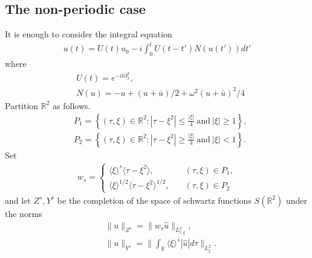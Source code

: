 \documentclass{amsart}
\newcommand{\rr}{\mathbb{R}}
\newcommand{\wh}{\widehat}
\newcommand{\p}{\partial}
\begin{document}
\subsection{The non-periodic case} 
\label{ssec:non-per-spaces}
It is enough to consider the integral equation
%
%
\begin{equation*}
\begin{split}
  u(t) = U(t) u_{0} -i \int_{0}^{t} U(t -t')N(u(t')) dt'
\end{split}
\end{equation*}
%
%
where 
%
%
\begin{equation*}
\begin{split}
  & U(t) = e^{-it \p_x^{2}},
  \\
  & N(u) = -u + (u + \bar{u})/2 + \omega^{2}(u + \bar{u})^{2}/4
\end{split}
\end{equation*}
%
%
Partition $\rr^{2}$ as follows.
%
%
\begin{equation*}
\begin{split}
  & P_{1} = \left\{ (\tau, \xi) \in \rr^{2}: | \tau - \xi^{2} | \le \frac{| \xi
  |}{4} \ \text{and} \ | \xi | \ge 1 \right\},
  \\
  & P_{2} = \left\{ (\tau, \xi) \in \rr^{2}: | \tau - \xi^{2} | \ge \frac{| \xi
  |}{4} \ \text{and} \ | \xi | < 1 \right\}.
\end{split}
\end{equation*}
%
%
Set
%
%
\begin{equation*}
\begin{split}
  w_{s} = 
  \begin{cases}
    \langle \xi \rangle ^{s} \langle \tau - \xi^{2} \rangle , \quad & (\tau,
    \xi) \in P_{1},
    \\
    \langle \xi \rangle ^{1/2} \langle \tau - \xi^{2} \rangle^{1/2}, \quad
    & (\tau, \xi) \in P_{2}
  \end{cases}
\end{split}
\end{equation*}
%
%
and let $Z^{s}, Y^{s}$ be the completion of the space of schwartz functions
$S(\rr^{2})$ under the norms
%
%
\begin{equation*}
\begin{split}
  & \| u \|_{Z^{s}} = \| w_{s} \wh{u} \|_{L^{2}_{\tau, \xi}},
  \\
  & \| u \|_{Y^{s}} = \| \int_{\rr} \langle \xi \rangle^{s} | \wh{u} | d \tau
  \|_{L^{2}_{\xi}}.
\end{split}
\end{equation*}
\end{document}
